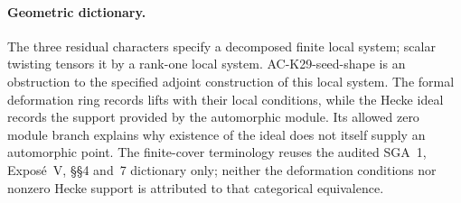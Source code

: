 \paragraph{Geometric dictionary.}
The three residual characters specify a decomposed finite
local system; scalar twisting tensors it by a rank-one
local system.  AC-K29-seed-shape is an obstruction to the
specified adjoint construction of this local system.
The formal deformation ring records lifts with their
local conditions, while the Hecke ideal records the support
provided by the automorphic module.  Its allowed zero
module branch explains why existence of the ideal does not
itself supply an automorphic point.  The finite-cover
terminology reuses the audited SGA~1, Expos\'e~V,
\S\S4 and~7 dictionary only; neither the deformation
conditions nor nonzero Hecke support is attributed to
that categorical equivalence.
